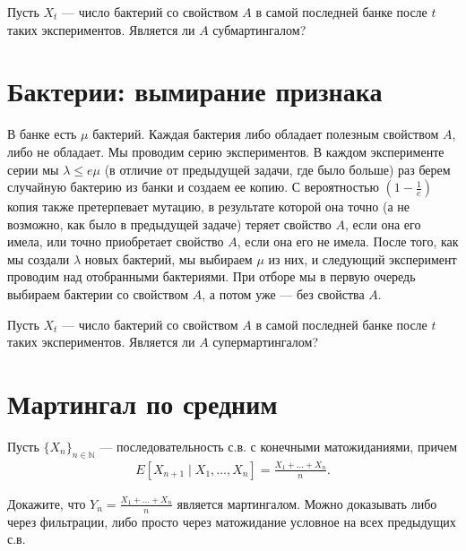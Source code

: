 \documentclass[12pt]{article}
\newcommand\N{\mathbb{N}}
\begin{document}
Пусть $X_t$ --- число бактерий со свойством $A$ в самой последней банке после $t$ таких экспериментов. Является ли $A$ субмартингалом? 

\section{Бактерии: вымирание признака}

В банке есть $\mu$ бактерий. Каждая бактерия либо обладает полезным свойством $A$, либо не обладает. Мы проводим серию экспериментов. В каждом эксперименте серии мы $\lambda \le e\mu$ (в отличие от предыдущей задачи, где было больше) раз берем случайную бактерию из банки и создаем ее копию. С вероятностью $(1 - \frac{1}{e})$ копия также претерпевает мутацию, в результате которой она точно (а не возможно, как было в предыдущей задаче) теряет свойство $A$, если она его имела, или точно приобретает свойство $A$, если она его не имела. После того, как мы создали $\lambda$ новых бактерий, мы выбираем $\mu$ из них, и следующий эксперимент проводим над отобранными бактериями. При отборе мы в первую очередь выбираем бактерии со свойством $A$, а потом уже --- без свойства $A$.

Пусть $X_t$ --- число бактерий со свойством $A$ в самой последней банке после $t$ таких экспериментов. Является ли $A$ супермартингалом? 

\section{Мартингал по средним}

Пусть $\{X_n\}_{n \in \N}$ --- последовательность с.в. с конечными матожиданиями, причем
\begin{align*}
    E[X_{n + 1} \mid X_1, \dots, X_n] = \frac{X_1 + \dots + X_n}{n}.
\end{align*}

Докажите, что $Y_n = \frac{X_1 + \dots + X_n}{n}$ является мартингалом. Можно доказывать либо через фильтрации, либо просто через матожидание условное на всех предыдущих с.в.
\end{document}

